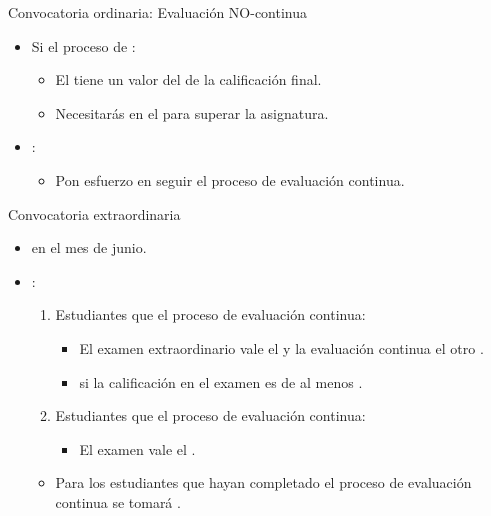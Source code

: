 \begin{frame}[t]{Convocatoria ordinaria: Evaluación NO-continua}
\begin{itemize}
  \item Si  el proceso de :
    \begin{itemize}
      \item El  tiene un valor del 
             de la calificación final.
      \item Necesitarás  en el  
            para superar la asignatura.
    \end{itemize}

  \item {}:
    \begin{itemize}
      \item Pon esfuerzo en seguir el proceso de evaluación continua.
    \end{itemize}
\end{itemize}
\end{frame}


\begin{frame}[t]{Convocatoria extraordinaria}
\begin{itemize}
  \item {} en el mes de junio.

  \item {}:
    \begin{enumerate}
      \item Estudiantes que  el proceso de evaluación continua:
        \begin{itemize}
          \item El examen extraordinario vale el  
                y la evaluación continua el otro .
          \item {} si la calificación en el examen es de 
                al menos .
        \end{itemize}
      \item Estudiantes que  el proceso de evaluación continua:
        \begin{itemize}
          \item El examen vale el .
        \end{itemize}
    \end{enumerate}

    \begin{itemize}
      \item Para los estudiantes que hayan completado el proceso de evaluación continua 
            se tomará .
    \end{itemize}
\end{itemize}
\end{frame}

